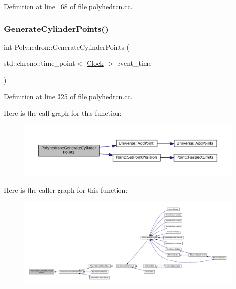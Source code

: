 Definition at line 168 of file polyhedron.\+cc.

\mbox{\label{class_polyhedron_a642a64ae8cde5e2a9f15334e151fd3f9}} 
\subsubsection{\texorpdfstring{Generate\+Cylinder\+Points()}{GenerateCylinderPoints()}}
{\footnotesize\ttfamily int Polyhedron\+::\+Generate\+Cylinder\+Points (\begin{DoxyParamCaption}\item[{std\+::chrono\+::time\+\_\+point$<$ \mbox{\hyperlink{universe_8h_a0ef8d951d1ca5ab3cfaf7ab4c7a6fd80}{Clock}} $>$}]{event\+\_\+time }\end{DoxyParamCaption})}



Definition at line 325 of file polyhedron.\+cc.

Here is the call graph for this function\+:\nopagebreak
\begin{figure}[H]
\begin{center}
\leavevmode
\includegraphics[width=350pt]{class_polyhedron_a642a64ae8cde5e2a9f15334e151fd3f9_cgraph}
\end{center}
\end{figure}
Here is the caller graph for this function\+:\nopagebreak
\begin{figure}[H]
\begin{center}
\leavevmode
\includegraphics[width=350pt]{class_polyhedron_a642a64ae8cde5e2a9f15334e151fd3f9_icgraph}
\end{center}
\end{figure}
\mbox{\label{class_polyhedron_a15d1cae35ceb6c1ba559928fd417800c}} 

